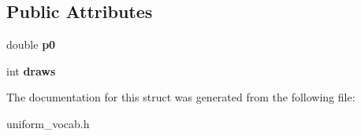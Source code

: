 \subsection*{Public Attributes}
\begin{DoxyCompactItemize}
\item 
\mbox{\label{structcpyp_1_1_uniform_vocabulary_a17aa628296af1f0f79bc5fb53b13ab5a}} 
double {\bfseries p0}
\item 
\mbox{\label{structcpyp_1_1_uniform_vocabulary_a24c863368834ca1b1bcb8a39983501db}} 
int {\bfseries draws}
\end{DoxyCompactItemize}


The documentation for this struct was generated from the following file\+:\begin{DoxyCompactItemize}
\item 
uniform\+\_\+vocab.\+h\end{DoxyCompactItemize}
